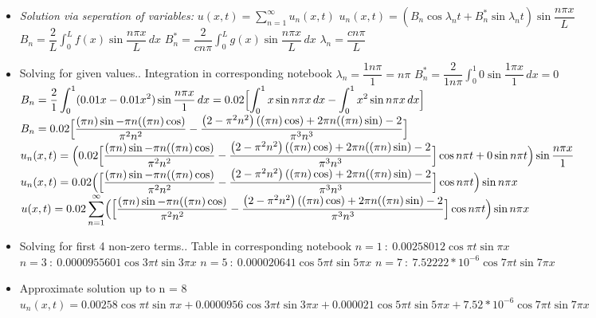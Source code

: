 \documentclass[10pt]{article}
\begin{document}
\begin{itemize}
    \item \textit{Solution via seperation of variables:} $ \displaystyle u(x,t) = \sum_{n = 1}^{\infty} u_n(x,t) $
    \subitem $ \displaystyle u_n(x,t) = (B_{n}\cos{\lambda_{n}t} + B^{*}_{n}\sin{\lambda_{n}t})\sin{\dfrac{n\pi x}{L}} $
    \subitem $ \displaystyle B_{n} =  \dfrac{2}{L} \int_{0}^{L} f(x)\sin{\dfrac{n\pi x}{L}} \,dx $
    \subitem $ \displaystyle B^{*}_{n} = \dfrac{2}{cn\pi} \int_{0}^{L} g(x)\sin{\dfrac{n\pi x}{L}} \,dx $
    \subitem $ \displaystyle \lambda_{n} = \dfrac{cn\pi}{L} $
    \item Solving for given values.. Integration in corresponding notebook
    \subitem $ \displaystyle \lambda_{n} = \dfrac{1n\pi}{1} = n\pi $
    \subitem $ \displaystyle B^{*}_{n} = \dfrac{2}{1n\pi} \int_{0}^{1} 0\sin{\dfrac{1\pi x}{1}} \,dx = 0 $
    \subitem $ \displaystyle B_{n} = \dfrac{2}{1} \int_{0}^{1} (0.01x - 0.01x^{2})\sin{\dfrac{n\pi x}{1}} \,dx = 0.02 \Bigl[ \int_{0}^{1} x\sin{n\pi x} \,dx - \int_{0}^{1} x^{2}\sin{n\pi x} \,dx \Bigr] $
    \subitem $ \displaystyle B_{n} = 0.02\Bigl[\dfrac{(\pi  n) \sin -\pi  n ((\pi  n) \cos )}{\pi ^2 n^2}-\dfrac{\left(2-\pi ^2 n^2\right) ((\pi  n) \cos )+2 \pi  n ((\pi  n) \sin )-2}{\pi ^3 n^3}\Bigr] $
    \subitem $ \displaystyle u_n(x,t) = \Bigl(0.02\Bigl[\dfrac{(\pi  n) \sin -\pi  n ((\pi  n) \cos )}{\pi ^2 n^2}-\dfrac{\left(2-\pi ^2 n^2\right) ((\pi  n) \cos )+2 \pi  n ((\pi  n) \sin )-2}{\pi ^3 n^3}\Bigr]\cos{n\pi t} + 0\sin{n\pi t}\Bigr)\sin{\dfrac{n\pi x}{1}} $
    \subitem $ \displaystyle u_n(x,t) = 0.02\Bigl(\Bigl[\dfrac{(\pi  n) \sin -\pi  n ((\pi  n) \cos )}{\pi ^2 n^2}-\dfrac{\left(2-\pi ^2 n^2\right) ((\pi  n) \cos )+2 \pi  n ((\pi  n) \sin )-2}{\pi ^3 n^3}\Bigr]\cos{n\pi t}\Bigr)\sin{n\pi x} $
    \subitem $ \displaystyle u(x,t) = 0.02 \sum_{n = 1}^{\infty} \Bigl(\Bigl[\dfrac{(\pi  n) \sin -\pi  n ((\pi  n) \cos )}{\pi ^2 n^2}-\dfrac{\left(2-\pi ^2 n^2\right) ((\pi  n) \cos )+2 \pi  n ((\pi  n) \sin )-2}{\pi ^3 n^3}\Bigr]\cos{n\pi t}\Bigr)\sin{n\pi x} $
    \item Solving for first 4 non-zero terms.. Table in corresponding notebook
    \subitem $ n = 1 \ : \ 0.00258012\cos{\pi t}\sin{\pi x} $
    \subitem $ n = 3 \ : \ 0.0000955601\cos{3\pi t}\sin{3\pi x} $
    \subitem $ n = 5 \ : \ 0.000020641\cos{5\pi t}\sin{5\pi x} $
    \subitem $ n = 7 \ : \ 7.52222*10^{-6}\cos{7\pi t}\sin{7\pi x} $
    \item Approximate solution up to n = 8
    \subitem  $ \displaystyle u_n(x,t) = 0.00258\cos{\pi t}\sin{\pi x} + 0.0000956\cos{3\pi t}\sin{3\pi x} + 0.000021\cos{5\pi t}\sin{5\pi x} + 7.52*10^{-6}\cos{7\pi t}\sin{7\pi x} $
\end{itemize}
\end{document}
